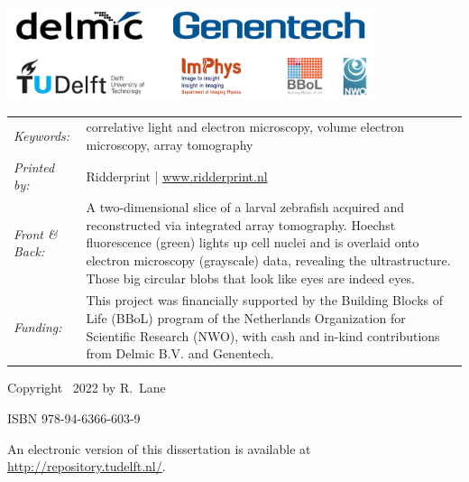 \begin{titlepage}
\vfill
\begin{center}
    \includegraphics[height=2.7cm]{title/logos/logos_v1.pdf}
\end{center}
\vfill

\noindent
\begin{tabular}{@{}p{}@{}p{}}
    \textit{Keywords:} & correlative light and electron microscopy, volume electron microscopy, array tomography \\[\medskipamount]
    \textit{Printed by:} & Ridderprint | \href{https://ridderprint.nl/}{www.ridderprint.nl} \\[\medskipamount]
    \textit{Front \& Back:} & A two-dimensional slice of a larval zebrafish acquired and reconstructed via integrated array tomography. Hoechst fluorescence (green) lights up cell nuclei and is overlaid onto electron microscopy (grayscale) data, revealing the ultrastructure. Those big circular blobs that look like eyes are indeed eyes. \\[\medskipamount]
    \textit{Funding:} & This project was financially supported by the Building Blocks of Life (BBoL) program of the Netherlands Organization for Scientific Research (NWO), with cash and in-kind contributions from Delmic B.V. and Genentech.
\end{tabular}

\vspace{4\bigskipamount}

\noindent Copyright \textcopyright\ 2022 by R.~Lane


\medskip
\noindent ISBN 978-94-6366-603-9

\medskip
\noindent An electronic version of this dissertation is available at \\
\url{http://repository.tudelft.nl/}.

\end{titlepage}
